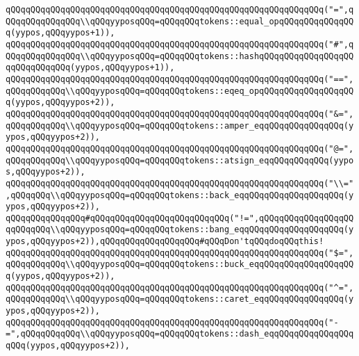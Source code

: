 \verb|qQQqqQQqqQQqqQQqqQQqqQQqqQQqqQQqqQQqqQQqqQQqqQQqqQQqqQQqqQQqqQQq("=",qQQqqQQqqQQqqQQq\\qQQqyyposqQQq=qQQqqQQqtokens::equal_opqQQqqQQqqQQqqQQq(yypos,qQQqyypos+1)),|\newline
\verb|qQQqqQQqqQQqqQQqqQQqqQQqqQQqqQQqqQQqqQQqqQQqqQQqqQQqqQQqqQQqqQQq("#",qQQqqQQqqQQqqQQq\\qQQqyyposqQQq=qQQqqQQqtokens::hashqQQqqQQqqQQqqQQqqQQqqQQqqQQqqQQq(yypos,qQQqyypos+1)),|\newline
\verb|qQQqqQQqqQQqqQQqqQQqqQQqqQQqqQQqqQQqqQQqqQQqqQQqqQQqqQQqqQQqqQQq("==",qQQqqQQqqQQq\\qQQqyyposqQQq=qQQqqQQqtokens::eqeq_opqQQqqQQqqQQqqQQqqQQq(yypos,qQQqyypos+2)),|\newline
\verb|qQQqqQQqqQQqqQQqqQQqqQQqqQQqqQQqqQQqqQQqqQQqqQQqqQQqqQQqqQQqqQQq("&=",qQQqqQQqqQQq\\qQQqyyposqQQq=qQQqqQQqtokens::amper_eqqQQqqQQqqQQqqQQq(yypos,qQQqyypos+2)),|\newline
\verb|qQQqqQQqqQQqqQQqqQQqqQQqqQQqqQQqqQQqqQQqqQQqqQQqqQQqqQQqqQQqqQQq("@=",qQQqqQQqqQQq\\qQQqyyposqQQq=qQQqqQQqtokens::atsign_eqqQQqqQQqqQQq(yypos,qQQqyypos+2)),|\newline
\verb|qQQqqQQqqQQqqQQqqQQqqQQqqQQqqQQqqQQqqQQqqQQqqQQqqQQqqQQqqQQqqQQq("\\=",qQQqqQQq\\qQQqyyposqQQq=qQQqqQQqtokens::back_eqqQQqqQQqqQQqqQQqqQQq(yypos,qQQqyypos+2)),|\newline
\verb|qQQqqQQqqQQqqQQq#qQQqqQQqqQQqqQQqqQQqqQQqqQQq("!=",qQQqqQQqqQQqqQQqqQQqqQQqqQQq\\qQQqyyposqQQq=qQQqqQQqtokens::bang_eqqQQqqQQqqQQqqQQqqQQq(yypos,qQQqyypos+2)),qQQqqQQqqQQqqQQqqQQq#qQQqDon'tqQQqdoqQQqthis!|\newline
\verb|qQQqqQQqqQQqqQQqqQQqqQQqqQQqqQQqqQQqqQQqqQQqqQQqqQQqqQQqqQQqqQQq("$=",qQQqqQQqqQQq\\qQQqyyposqQQq=qQQqqQQqtokens::buck_eqqQQqqQQqqQQqqQQqqQQq(yypos,qQQqyypos+2)),|\newline
\verb|qQQqqQQqqQQqqQQqqQQqqQQqqQQqqQQqqQQqqQQqqQQqqQQqqQQqqQQqqQQqqQQq("^=",qQQqqQQqqQQq\\qQQqyyposqQQq=qQQqqQQqtokens::caret_eqqQQqqQQqqQQqqQQq(yypos,qQQqyypos+2)),|\newline
\verb|qQQqqQQqqQQqqQQqqQQqqQQqqQQqqQQqqQQqqQQqqQQqqQQqqQQqqQQqqQQqqQQq("-=",qQQqqQQqqQQq\\qQQqyyposqQQq=qQQqqQQqtokens::dash_eqqQQqqQQqqQQqqQQqqQQq(yypos,qQQqyypos+2)),|\newline
